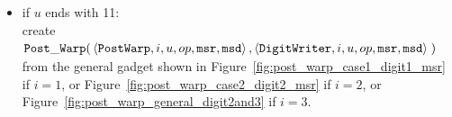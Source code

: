 \begin{itemize}
\begin{itemize}
            \item if $u$ ends with 11:\\
            create
            $\begin{aligned}[t]
                {\tt Post\_Warp}(& \left \langle {\tt PostWarp},    i, u, op, {\tt msr}, {\tt msd} \right\rangle,
                            \left \langle {\tt DigitWriter}, i, u, op, {\tt msr}, {\tt msd} \right\rangle \;)
            \end{aligned}$ \\
            from the general gadget shown in Figure~\ref{fig:post_warp_case1_digit1_msr} if $i = 1$, or
            Figure~\ref{fig:post_warp_case2_digit2_msr} if $i = 2$, or Figure~\ref{fig:post_warp_general_digit2and3} if $i = 3$.
            \vspace{.5cm}

        \end{itemize}



\end{itemize}
